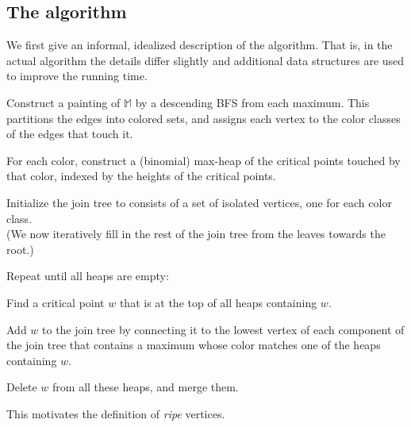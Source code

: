 \documentclass[11pt]{article}
\theoremstyle{definition}
\newcommand{\MM}{\mathbb{M}}
\begin{document}
\subsection{The algorithm} \label{sec:algo}

We first give an informal, idealized description of the algorithm. 
That is, in the actual algorithm the details differ slightly
and additional data structures are used to improve the running time.

\medskip

\begin{compactenum}
    \item Construct a painting of $\MM$ by a descending BFS from each maximum. 
    This partitions the edges into colored sets, 
    and assigns each vertex to the color classes of the edges that touch it.
    \item For each color, construct a (binomial) max-heap of the critical points touched by that color, 
          indexed by the heights of the critical points.
    \item Initialize the join tree to consists of a set of isolated vertices, one for each color class.\\
          (We now iteratively fill in the rest of the join tree from the leaves towards the root.)
    \item Repeat until all heaps are empty:
    \begin{compactenum}
        \item Find a critical point $w$ that is at the top of all heaps containing $w$.
        \item Add $w$ to the join tree by connecting it to the lowest vertex 
              of each component of the join tree that contains a maximum whose color matches one of the heaps containing $w$.
        \item Delete $w$ from all these heaps, and merge them.
    \end{compactenum}
\end{compactenum}

\medskip

\noindent
This motivates the definition of \emph{ripe} vertices.
\end{document}
